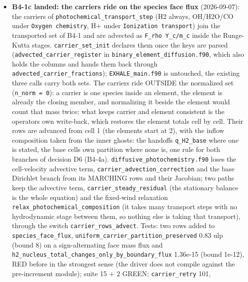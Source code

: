 \documentclass[english,a4paper]{my_memo}
\begin{document}
\begin{itemize}
  discarded, then a second traversal forms the cooling (16 percent
  together); \texttt{mol\_base\_handoff} in phys refuses 7 of its first 60 steps at
  the fixed point on the unmodified tree.
\item
  \textbf{B4-1c landed: the carriers ride on the species face flux} (2026-09-07):
  the carriers of \texttt{photochemical\_transport\_step} (H2 always, OH/H2O/CO under
  \texttt{Oxygen\ chemistry}, H+ under \texttt{Ionization\ transport}) join the transported
  set of B4-1 and are advected as \texttt{F\_rho\ Y\_c/m\_c} inside the Runge-Kutta
  stages. \texttt{carrier\_set\_init} declares them once the keys are parsed
  (\texttt{advected\_carrier\_register} in \texttt{binary\_element\_diffusion.f90}, which also
  holds the columns and hands them back through
  \texttt{advected\_carrier\_fractions}); \texttt{EXHALE\_main.f90} is untouched, the existing
  three calls carry both sets. The carriers ride OUTSIDE the normalized set
  (\texttt{n\_norm\ =\ 0}): a carrier is one species inside an element, the element is
  already the closing member, and normalizing it beside the element would
  count that mass twice; what keeps carrier and element consistent is the
  operator\textquotesingle s own write-back, which restores the element totals cell by cell.
  Their rows are advanced from cell 1 (the elements\textquotesingle{} start at 2), with the
  inflow composition taken from the inner ghosts: the handoff\textquotesingle s \texttt{q\_H2\_base}
  where one is stated, the base cell\textquotesingle s own partition where none is, one rule
  for both branches of decision D6 (B4-4a). \texttt{diffusive\_photochemistry.f90}
  loses the cell-velocity advective term, \texttt{carrier\_advection\_correction} and
  the base Dirichlet branch from its MARCHING rows and their Jacobian; two
  paths keep the advective term, \texttt{carrier\_steady\_residual} (the stationary
  balance is the whole equation) and the fixed-wind relaxation
  \texttt{relax\_photochemical\_composition} (it takes many transport steps with no
  hydrodynamic stage between them, so nothing else is taking that transport),
  through the switch \texttt{carrier\_rows\_advect}. Tests: two rows added to
  \texttt{species\_face\_flux}, \texttt{uniform\_carrier\_partition\_preserved} 0.83 ulp (bound
  8) on a sign-alternating face mass flux and
  \texttt{h2\_nucleus\_total\_changes\_only\_by\_boundary\_flux} 1.36e-15 (bound 1e-12),
  RED before in the strongest sense (the driver does not compile against the
  pre-increment module); suite 15 + 2 GREEN; \texttt{carrier\_retry} 101,

\end{itemize}
\end{document}
